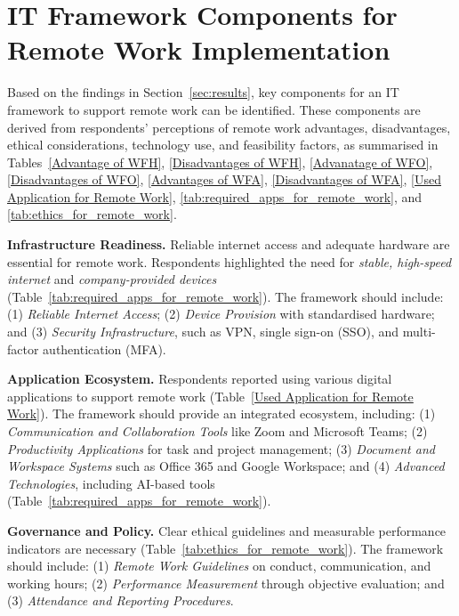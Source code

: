 \documentclass[a4paper, conference]{IEEEtran}
\begin{document}
\section{IT Framework Components for Remote Work Implementation}
\label{sec:it-framework}


Based on the findings in Section~\ref{sec:results}, key components for an IT framework to support remote work can be identified. These components are derived from respondents’ perceptions of remote work advantages, disadvantages, ethical considerations, technology use, and feasibility factors, as summarised in Tables~\ref{Advantage of WFH}, \ref{Disadvantages of WFH}, \ref{Advanatage of WFO}, \ref{Disadvantages of WFO}, \ref{Advantages of WFA}, \ref{Disadvantages of WFA}, \ref{Used Application for Remote Work}, \ref{tab:required_apps_for_remote_work}, and \ref{tab:ethics_for_remote_work}.

\textbf{Infrastructure Readiness.}
Reliable internet access and adequate hardware are essential for remote work. Respondents highlighted the need for \textit{stable, high-speed internet} and \textit{company-provided devices} (Table~\ref{tab:required_apps_for_remote_work}). The framework should include: (1) \textit{Reliable Internet Access}; (2) \textit{Device Provision} with standardised hardware; and (3) \textit{Security Infrastructure}, such as VPN, single sign-on (SSO), and multi-factor authentication (MFA).

\textbf{Application Ecosystem.}
Respondents reported using various digital applications to support remote work (Table~\ref{Used Application for Remote Work}). The framework should provide an integrated ecosystem, including: (1) \textit{Communication and Collaboration Tools} like Zoom and Microsoft Teams; (2) \textit{Productivity Applications} for task and project management; (3) \textit{Document and Workspace Systems} such as Office 365 and Google Workspace; and (4) \textit{Advanced Technologies}, including AI-based tools (Table~\ref{tab:required_apps_for_remote_work}).

\textbf{Governance and Policy.}
Clear ethical guidelines and measurable performance indicators are necessary (Table~\ref{tab:ethics_for_remote_work}). The framework should include: (1) \textit{Remote Work Guidelines} on conduct, communication, and working hours; (2) \textit{Performance Measurement} through objective evaluation; and (3) \textit{Attendance and Reporting Procedures}.
\end{document}

